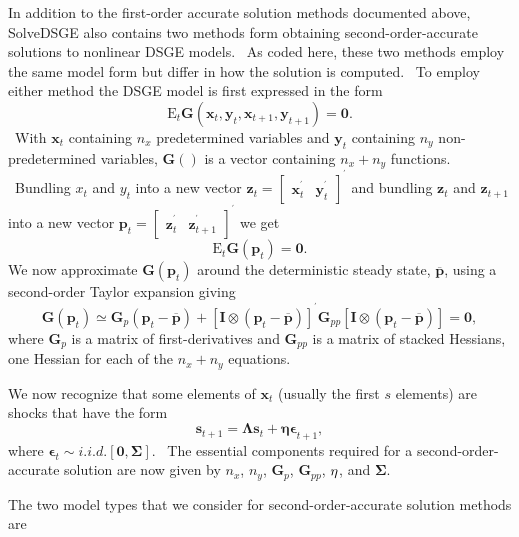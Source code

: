\documentclass[thmsa,notitlepage,11pt]{article}
\begin{document}
In addition to the first-order accurate solution methods documented above,
SolveDSGE also contains two methods form obtaining second-order-accurate
solutions to nonlinear DSGE models. \ As coded here, these two methods
employ the same model form but differ in how the solution is computed. \ To
employ either method the DSGE model is first expressed in the form%
\[
\text{E}_{t}\mathbf{G}\left( \mathbf{x}_{t},\mathbf{y}_{t},\mathbf{x}_{t+1},%
\mathbf{y}_{t+1}\right) =\mathbf{0}. 
\]%
\ With $\mathbf{x}_{t}$ containing $n_{x}$ predetermined variables and $%
\mathbf{y}_{t}$ containing $n_{y}$ non-predetermined variables, $\mathbf{G}%
() $ is a vector containing $n_{x}+n_{y}$ functions. \ Bundling $x_{t}$ and $%
y_{t}$ into a new vector $\mathbf{z}_{t}=\left[ 
\begin{array}{cc}
\mathbf{x}_{t}^{^{\prime }} & \mathbf{y}_{t}^{^{\prime }}%
\end{array}%
\right] ^{^{\prime }}$ and bundling $\mathbf{z}_{t}$ and $\mathbf{z}_{t+1}$
into a new vector $\mathbf{p}_{t}=\left[ 
\begin{array}{cc}
\mathbf{z}_{t}^{^{\prime }} & \mathbf{z}_{t+1}^{^{\prime }}%
\end{array}%
\right] ^{^{\prime }}$ we get%
\[
\text{E}_{t}\mathbf{G}\left( \mathbf{p}_{t}\right) =\mathbf{0}. 
\]%
We now approximate $\mathbf{G}\left( \mathbf{p}_{t}\right) $ around the
deterministic steady state, $\overline{\mathbf{p}}$, using a second-order
Taylor expansion giving%
\[
\mathbf{G}\left( \mathbf{p}_{t}\right) \simeq \mathbf{G}_{p}\left( \mathbf{p}%
_{t}-\overline{\mathbf{p}}\right) +\left[ \mathbf{I}\otimes \left( \mathbf{p}%
_{t}-\overline{\mathbf{p}}\right) \right] ^{^{\prime }}\mathbf{G}_{pp}\left[ 
\mathbf{I}\otimes \left( \mathbf{p}_{t}-\overline{\mathbf{p}}\right) \right]
=\mathbf{0}, 
\]%
where $\mathbf{G}_{p}$ is a matrix of first-derivatives and $\mathbf{G}_{pp}$
is a matrix of stacked Hessians, one Hessian for each of the $n_{x}+n_{y}$
equations.

We now recognize that some elements of $\mathbf{x}_{t}$ (usually the first $%
s $ elements) are shocks that have the form%
\[
\mathbf{s}_{t+1}=\mathbf{\Lambda s}_{t}+\mathbf{\eta \epsilon }_{t+1}, 
\]%
where $\mathbf{\epsilon }_{t}\sim i.i.d.[\mathbf{0},\mathbf{\Sigma }]$. \
The essential components required for a second-order-accurate solution are
now given by $n_{x}$, $n_{y}$, $\mathbf{G}_{p}$, $\mathbf{G}_{pp}$, $\mathbf{%
\eta }$, and $\mathbf{\Sigma }$.

The two model types that we consider for second-order-accurate solution
methods are
\end{document}
